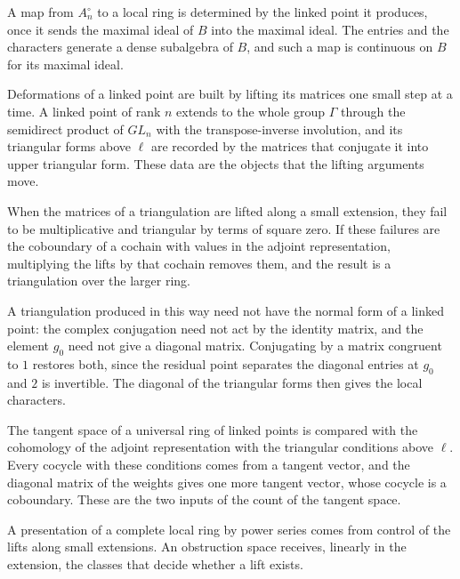 A map from $A_n^\circ$ to a local ring is determined by the linked point it produces, once it sends the maximal ideal of $B$ into the maximal ideal. The entries and the characters generate a dense subalgebra of $B$, and such a map is continuous on $B$ for its maximal ideal.

Deformations of a linked point are built by lifting its matrices one small step at a time. A linked point of rank $n$ extends to the whole group $\Gamma$ through the semidirect product of $GL_n$ with the transpose-inverse involution, and its triangular forms above $\ell$ are recorded by the matrices that conjugate it into upper triangular form. These data are the objects that the lifting arguments move.

When the matrices of a triangulation are lifted along a small extension, they fail to be multiplicative and triangular by terms of square zero. If these failures are the coboundary of a cochain with values in the adjoint representation, multiplying the lifts by that cochain removes them, and the result is a triangulation over the larger ring.

A triangulation produced in this way need not have the normal form of a linked point: the complex conjugation need not act by the identity matrix, and the element $g_0$ need not give a diagonal matrix. Conjugating by a matrix congruent to $1$ restores both, since the residual point separates the diagonal entries at $g_0$ and $2$ is invertible. The diagonal of the triangular forms then gives the local characters.

The tangent space of a universal ring of linked points is compared with the cohomology of the adjoint representation with the triangular conditions above $\ell$. Every cocycle with these conditions comes from a tangent vector, and the diagonal matrix of the weights gives one more tangent vector, whose cocycle is a coboundary. These are the two inputs of the count of the tangent space.

A presentation of a complete local ring by power series comes from control of the lifts along small extensions. An obstruction space receives, linearly in the extension, the classes that decide whether a lift exists.

